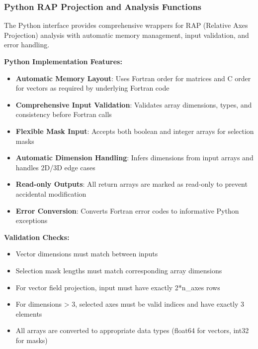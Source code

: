 \subsubsection{Python RAP Projection and Analysis Functions}

The Python interface provides comprehensive wrappers for RAP (Relative Axes Projection) analysis with automatic memory management, input validation, and error handling.

\textbf{Python Implementation Features:}
\begin{itemize}
    \item \textbf{Automatic Memory Layout}: Uses Fortran order for matrices and C order for vectors as required by underlying Fortran code
    \item \textbf{Comprehensive Input Validation}: Validates array dimensions, types, and consistency before Fortran calls
    \item \textbf{Flexible Mask Input}: Accepts both boolean and integer arrays for selection masks
    \item \textbf{Automatic Dimension Handling}: Infers dimensions from input arrays and handles 2D/3D edge cases
    \item \textbf{Read-only Outputs}: All return arrays are marked as read-only to prevent accidental modification
    \item \textbf{Error Conversion}: Converts Fortran error codes to informative Python exceptions
\end{itemize}

\textbf{Validation Checks:}
\begin{itemize}
    \item Vector dimensions must match between inputs
    \item Selection mask lengths must match corresponding array dimensions
    \item For vector field projection, input must have exactly 2*n\_axes rows
    \item For dimensions > 3, selected axes must be valid indices and have exactly 3 elements
    \item All arrays are converted to appropriate data types (float64 for vectors, int32 for masks)
\end{itemize}

